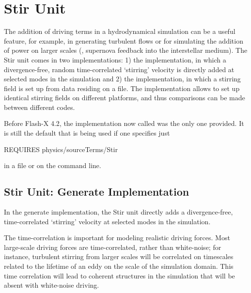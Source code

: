 


\section{Stir Unit}
\label{Sec:stir}

The addition of driving terms in a hydrodynamical simulation can
be a useful feature, for example, in generating turbulent flows or
for simulating the addition of power on larger scales (\eg, supernova
feedback into the interstellar medium).  The \unit{Stir}
unit comes in two implementations: 1) the  implementation, in which a divergence-free,
random time-correlated `stirring' velocity is directly added at selected modes in the
simulation and 2) the  implementation, in which a stirring field
is set up from data residing on a file. The  implementation allows to
set up identical stirring fields on different platforms, and thus comparisons
can be made between different codes.

Before Flash-X 4.2, the implementation now called  was 
the only one provided.  It is still the default that is being
used if one specifies just 
\begin{code}
  REQUIRES physics/sourceTerms/Stir
\end{code}
in a  file or  on the 
 command line.

\subsection{Stir Unit: Generate Implementation}
\label{Sec:stirgenerate}

In the generate implementation, the Stir unit directly adds a divergence-free, time-correlated
`stirring' velocity at selected modes in the simulation.

The time-correlation is important for modeling realistic driving
forces.   Most large-scale driving forces are time-correlated, rather
than white-noise; for instance, turbulent stirring from larger scales
will be correlated on timescales related to the lifetime of an eddy
on the scale of the simulation domain.  This time correlation
will lead to coherent structures in the simulation that will be
absent with white-noise driving.

